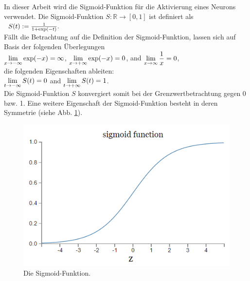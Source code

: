 \noindent
In dieser Arbeit wird die Sigmoid-Funktion für die Aktivierung eines Neurons verwendet. Die Sigmoid-Funktion $S:\mathbb{R} \rightarrow [0,1]$ ist definiert als \\[0.2cm]
\hspace*{1.3cm}
$
\begin{array}[t]{lclll}
	S(t) := \frac{1}{1+\exp(-t)}.
\end{array}
$
\\[0.2cm]
Fällt die Betrachtung auf die Definition der Sigmoid-Funktion, lassen sich auf Basis der folgenden Überlegungen \\[0.2cm]
\hspace*{1.3cm}
$\displaystyle\lim\limits_{x\rightarrow
-\infty} \exp(-x) = \infty$, \quad 
$\displaystyle\lim\limits_{x\rightarrow+\infty} \exp(-x) = 0$, \quad and \quad
$\displaystyle\lim\limits_{x\rightarrow\infty} \frac{1}{x} = 0$, 
\\[0.2cm]
die folgenden Eigenschaften ableiten: \\[0.2cm]
\hspace*{1.3cm}
$\displaystyle \lim_{t\rightarrow-\infty} S(t) = 0$ \quad and \quad
$\displaystyle \lim_{t\rightarrow+\infty} S(t) = 1$.
\\[0.2cm]
Die Sigmoid-Funktion $S$ konvergiert somit bei der Grenzwertbetrachtung gegen 0 bzw. 1. Eine weitere Eigenschaft der Sigmoid-Funktion besteht in deren Symmetrie (siehe Abb. \ref{fig:sigmoid_plot}). 
\begin{figure}[hbt]
	\centering
	\includegraphics[scale=0.7]{Bilder/sigmoid_plot}
	\caption{Die Sigmoid-Funktion.} 
	\label{fig:sigmoid_plot} 
\end{figure}

